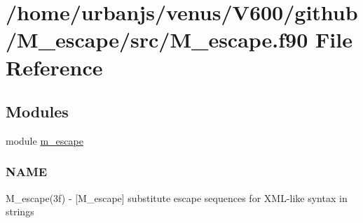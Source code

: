 \hypertarget{M__escape_8f90}{}\section{/home/urbanjs/venus/\+V600/github/\+M\+\_\+escape/src/\+M\+\_\+escape.f90 File Reference}
\label{M__escape_8f90}
\subsection*{Modules}
\begin{DoxyCompactItemize}
\item 
module \mbox{\hyperlink{namespacem__escape}{m\+\_\+escape}}
\begin{DoxyCompactList}\small\item\em \subsubsection*{N\+A\+ME}

M\+\_\+escape(3f) -\/ \mbox{[}M\+\_\+escape\mbox{]} substitute escape sequences for X\+M\+L-\/like syntax in strings \end{DoxyCompactList}\end{DoxyCompactItemize}
